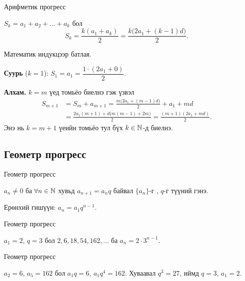\begin{frame}[allowframebreaks]{Арифметик прогресс}
\begin{theorem}
$S_k=a_1+a_2+\dots+a_k$ бол
\[
S_k=\frac{k(a_1+a_k)}{2}=\frac{k\bigl(2a_1+(k-1)d\bigr)}{2}.
\]
\end{theorem}
\begin{prof}
Математик индукцээр батлая.

\textbf{Суурь} ($k=1$): $S_1=a_1=\dfrac{1\cdot(2a_1+0)}{2}$.

\textbf{Алхам.} $k=m$ үед томьёо биелнэ гэж үзвэл
\begin{align*}
S_{m+1}&=S_m+a_{m+1}=\frac{m\bigl(2a_1+(m-1)d\bigr)}{2}+a_1+md\\
&=\frac{2a_1(m+1)+d\bigl(m(m-1)+2m\bigr)}{2}=\frac{(m+1)(2a_1+md)}{2}.
\end{align*}
Энэ нь $k=m+1$ үеийн томьёо тул бүх $k\in\mathbb{N}$-д биелнэ.
\end{prof}
\end{frame}

\subsection{Геометр прогресс}
\begin{frame}[allowframebreaks]{Геометр прогресс}
\begin{definition}
$a_n\neq0$ ба $\forall n\in\mathbb{N}$ хувьд $a_{n+1}=a_nq$ байвал $\{a_n\}$-г
, $q$-г түүний  гэнэ.
\end{definition}

Ерөнхий гишүүн: $a_n=a_1q^{n-1}$.
\end{frame}

\begin{frame}[allowframebreaks]{Геометр прогресс}
\begin{example}
$a_1=2$, $q=3$ бол $2,6,18,54,162,\ldots$ ба $a_n=2\cdot3^{n-1}$.
\end{example}
\end{frame}

\begin{frame}[allowframebreaks]{Геометр прогресс}
\begin{example}
$a_2=6$, $a_5=162$ бол $a_1q=6$, $a_1q^4=162$. Хуваавал $q^3=27$, иймд $q=3$, $a_1=2$.
\end{example}
\end{frame}

